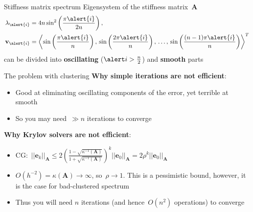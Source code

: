 \documentclass[svgnames]{beamer} %
\newcommand{\vect}[1]{\boldsymbol{\mathbf{#1}}}
\begin{document}
	\begin{frame}{Stiffness matrix spectrum}
		Eigensystem of the stiffness matrix~$\vect A$
		\begin{align*}
			\lambda_{\alert{i}} &= 4 n \sin^2 \left( \frac{\pi \alert{i}}{2 n} \right), \\
			\vect v_{\alert{i}} &= \left\langle \sin \left( \frac{\pi \alert{i}}{n} \right), \, \sin \left( \frac{2 \pi \alert{i}}{n} \right), \, \dots, \, \sin \left( \frac{(n - 1) \pi \alert{i}}{n} \right) \right\rangle^T
		\end{align*}
		can be divided into \textbf{oscillating} ($\alert i > \frac{n}{2}$) and \textbf{smooth} parts \\
		\begin{figure}
		\centering
		\end{figure}
	\end{frame}

	\begin{frame}{The problem with clustering}
		\textbf{Why simple iterations are not efficient}:
		\begin{itemize}
			\item Good at eliminating oscillating components of the error, yet terrible at smooth
			\item So you may need~$\gg n$ iterations to converge 
		\end{itemize}
		\textbf{Why Krylov solvers are not efficient}:
		\begin{itemize}
			\item CG:~$|| \vect e_k ||_{\vect A} \le 2 \left( \frac{1 - \sqrt{\kappa^{-1}(\vect A)}}{1 + \sqrt{\kappa^{-1}(\vect A)}} \right)^k || \vect e_0 ||_{\vect A} = 2 \rho^k || \vect e_0 ||_{\vect A}$
			\item $O(h^{-2}) = \kappa(\vect A) \to \infty$, so~$\rho \to 1$. This is a pessimistic bound, however, it is the case for bad-clustered spectrum
			\item Thus you will need $n$ iterations (and hence~$O(n^2)$ operations) to converge
		\end{itemize}
	\end{frame}
\end{document}
